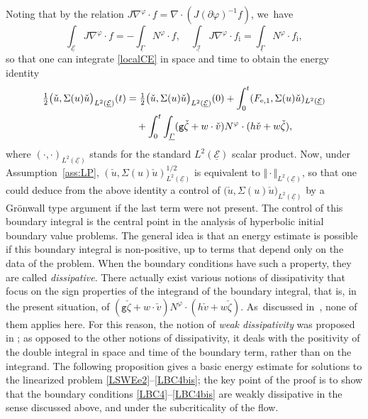 \documentclass[10pt]{amsart}
\newcommand{\gr}{{\mathtt g}}
\newcommand{\cI}{{\mathcal I}}
\newcommand{\cE}{{\mathcal E}}
\newcommand{\ul}[1]{\underline{#1}}
\newcommand{\itGamma}{\mathit{\Gamma}}
\theoremstyle{definition}
\begin{document}
Noting that by the relation $J\nabla^\varphi\cdot f=\nabla\cdot(J(\partial\varphi)^{-1}f)$, we~have
\begin{equation}\label{DivTh}
\int_{\ul{\cE}}J\nabla^\varphi\cdot f = -\int_{\ul{\itGamma}}N^\varphi\cdot f, \quad
\int_{\ul{\cI}}J\nabla^\varphi\cdot f_\mathrm{i} = \int_{\ul{\itGamma}}N^\varphi\cdot f_\mathrm{i},
\end{equation}
so that one can integrate \eqref{localCE} in space and time to obtain the energy identity
\begin{align}\label{weakdissip0}
\tfrac{1}{2} \big(\check{u},\Sigma(u)\check{u}\big)_{L^2(\ul{\cE})}(t)
&= \tfrac{1}{2} \big(\check{u},\Sigma(u)\check{u}\big)_{L^2(\ul{\cE})}(0)
+ \int_0^t (F_{{\rm e},1},\Sigma(u)\check{u})_{L^2(\ul{\cE})} \\
&\quad
+ \int_0^t \int_{\ul\itGamma} (\gr\check{\zeta}+w\cdot\check{v}) N^\varphi\cdot (h\check{v}+w\check{\zeta}), \nonumber
\end{align}
where $(\cdot,\cdot)_{L^2(\ul{\cE})}$ stands for the standard $L^2(\ul{\cE})$ scalar product.
Now, under Assumption~\ref{ass:LP}, $(\check{u},\Sigma(u)\check{u})_{L^2(\ul{\cE})}^{1/2}$ is equivalent to $\Vert \cdot \Vert_{L^2(\ul{\cE})}$,
so that one could deduce from the above identity a control of $\big(\check{u},\Sigma(u)\check{u}\big)_{L^2(\ul{\cE})}$ by a Grönwall type argument
if the last term were not present.
The control of this boundary integral is the central point in the analysis of hyperbolic initial boundary value problems.
The general idea is that an energy estimate is possible if this boundary integral is non-positive, up to terms that depend only on the data of the problem.
When the boundary conditions have such a property, they are called {\it dissipative}.
There actually exist various notions of dissipativity that focus on the sign properties of the integrand of the boundary integral, that is,
in the present situation, of $(\gr\check{\zeta}+w\cdot\check{v}) N^\varphi\cdot (h\check{v}+w\check{\zeta})$. As~discussed in~\cite{IguchiLannes2023}, none of them applies here.
For this reason, the notion of {\it weak dissipativity} was proposed in \cite{IguchiLannes2023}; as opposed to the other notions of dissipativity,
it deals with the positivity of the double integral in space and time of the boundary term, rather than on the integrand.
The following proposition gives a basic energy estimate for solutions to the linearized problem \eqref{LSWEe2}--\eqref{LBC4bis};
the key point of the proof is to show that the boundary conditions \eqref{LBC4}--\eqref{LBC4bis} are weakly dissipative in the sense discussed above,
and under the subcriticality of the flow.
\end{document}
